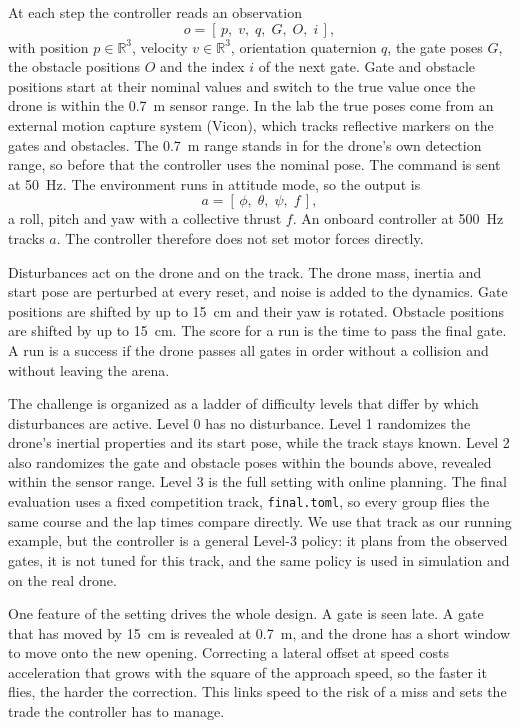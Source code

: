\documentclass[conference]{IEEEtran}
\begin{document}
At each step the controller reads an observation
\begin{equation}
o = [\, p,\; v,\; q,\; G,\; O,\; i \,],
\label{eq:obs}
\end{equation}
with position $p \in \mathbb{R}^3$, velocity $v \in \mathbb{R}^3$, orientation quaternion $q$, the gate poses $G$, the obstacle positions $O$ and the index $i$ of the next gate. Gate and obstacle positions start at their nominal values and switch to the true value once the drone is within the 0.7~m sensor range. In the lab the true poses come from an external motion capture system (Vicon), which tracks reflective markers on the gates and obstacles. The 0.7~m range stands in for the drone's own detection range, so before that the controller uses the nominal pose. The command is sent at 50~Hz. The environment runs in attitude mode, so the output is
\begin{equation}
a = [\, \phi,\; \theta,\; \psi,\; f \,],
\label{eq:act}
\end{equation}
a roll, pitch and yaw with a collective thrust $f$. An onboard controller at 500~Hz tracks $a$. The controller therefore does not set motor forces directly.

Disturbances act on the drone and on the track. The drone mass, inertia and start pose are perturbed at every reset, and noise is added to the dynamics. Gate positions are shifted by up to 15~cm and their yaw is rotated. Obstacle positions are shifted by up to 15~cm. The score for a run is the time to pass the final gate. A run is a success if the drone passes all gates in order without a collision and without leaving the arena.

The challenge is organized as a ladder of difficulty levels that differ by which disturbances are active. Level 0 has no disturbance. Level 1 randomizes the drone's inertial properties and its start pose, while the track stays known. Level 2 also randomizes the gate and obstacle poses within the bounds above, revealed within the sensor range. Level 3 is the full setting with online planning. The final evaluation uses a fixed competition track, \texttt{final.toml}, so every group flies the same course and the lap times compare directly. We use that track as our running example, but the controller is a general Level-3 policy: it plans from the observed gates, it is not tuned for this track, and the same policy is used in simulation and on the real drone.

One feature of the setting drives the whole design. A gate is seen late. A gate that has moved by 15~cm is revealed at 0.7~m, and the drone has a short window to move onto the new opening. Correcting a lateral offset at speed costs acceleration that grows with the square of the approach speed, so the faster it flies, the harder the correction. This links speed to the risk of a miss and sets the trade the controller has to manage.
\end{document}
